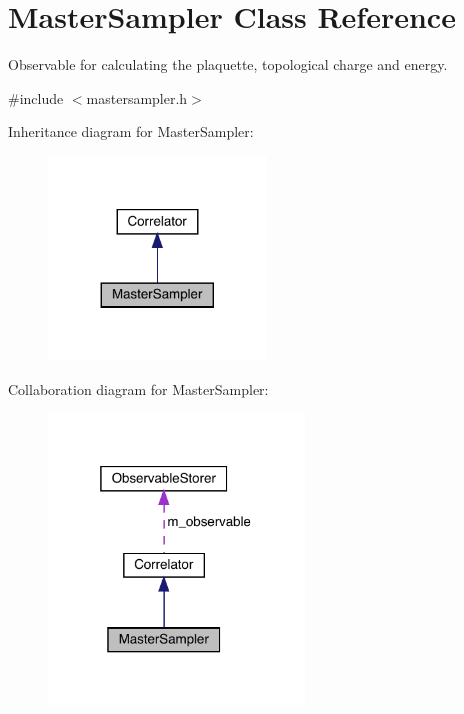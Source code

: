 \hypertarget{class_master_sampler}{}\section{Master\+Sampler Class Reference}
\label{class_master_sampler}


Observable for calculating the plaquette, topological charge and energy.  




{\ttfamily \#include $<$mastersampler.\+h$>$}



Inheritance diagram for Master\+Sampler\+:\nopagebreak
\begin{figure}[H]
\begin{center}
\leavevmode
\includegraphics[width=164pt]{class_master_sampler__inherit__graph}
\end{center}
\end{figure}


Collaboration diagram for Master\+Sampler\+:\nopagebreak
\begin{figure}[H]
\begin{center}
\leavevmode
\includegraphics[width=193pt]{class_master_sampler__coll__graph}
\end{center}
\end{figure}
